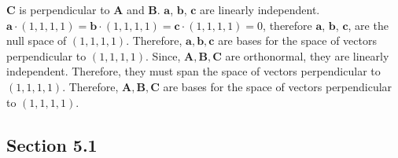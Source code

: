 \documentclass[main.tex]{subfiles}
\begin{document}
\begin{enumerate}
    $\bm{C}$ is perpendicular to $\bm{A}$ and $\bm{B}$. $\bm{a}$, $\bm{b}$, $\bm{c}$ are linearly independent. $\bm{a} \cdot (1,1,1,1) = \bm{b} \cdot (1,1,1,1)= \bm{c} \cdot (1,1,1,1)=0$, therefore $\bm{a}$, $\bm{b}$, $\bm{c}$, are the null space of $(1,1,1,1)$. Therefore, $\bm{a}, \bm{b}, \bm{c}$ are bases for the space of vectors perpendicular to $(1,1,1,1)$. Since, $\bm{A}, \bm{B}, \bm{C}$ are orthonormal, they are linearly independent. Therefore, they must span the space of vectors perpendicular to $(1,1,1,1)$. Therefore, $\bm{A}, \bm{B}, \bm{C}$ are bases for the space of vectors perpendicular to $(1,1,1,1)$.
    
\end{enumerate}

\subsection{Section 5.1}
\end{document}
